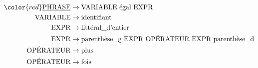 \[
    \begin{aligned}
        \color{red}\underline{\text{PHRASE}} & \to \text{VARIABLE \'egal EXPR} \\
        \text{VARIABLE}           & \to \text{identifiant} \\
        \text{EXPR}               & \to \text{litt\'eral\_d’entier}  \\
        \text{EXPR}               & \to \text{parenth\`ese\_g EXPR OPÉRATEUR EXPR parenth\`ese\_d}  \\
        \text{OPÉRATEUR}          & \to \text{plus} \\
        \text{OPÉRATEUR}          & \to \text{fois}
    \end{aligned}
\]
